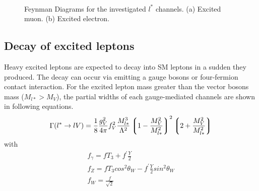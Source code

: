 \begin{figure}[h!]
\centering
{}
\\
\caption{\label{fig:Feyman_ExLep}Feynman Diagrams for the investigated $l^{*}$ channels. (a) Excited muon. (b) Excited electron.}
\end{figure}
\subsection{Decay of excited leptons}
Heavy excited leptons are expected to decay into SM leptons in a sudden they produced. The decay can occur via emitting a gauge bosons or four-fermion contact interaction. For the excited lepton mass greater than the vector bosons mass ($M_{l*} > M_{V}$), the partial widths of each gauge-mediated channels are shown in following equations.
\begin{align}
\Gamma (l^{*}\rightarrow lV) = \frac{1}{8}\frac{g_{V}^{2}}{4\pi}f_{V}^{2}\frac{M_{l*}^{3}}{\Lambda^{2}}\left\lgroup1 - \frac{M_{V}^{2}}{M_{l*}^{2}}\right\rgroup^{2}\left\lgroup2 + \frac{M_{V}^{2}}{M_{l*}^{2}}\right\rgroup
\end{align}
\noindent with
\begin{align}
f_{\gamma} = fT_{3} + f^{\prime}\frac{Y}{2}\\ 
f_{Z} = fT_{3}cos^{2}\theta_{W} - f^{\prime}\frac{Y}{2}sin^{2}\theta_{W}\\
f_{W} = \frac{f}{\sqrt{2}}
\end{align}

